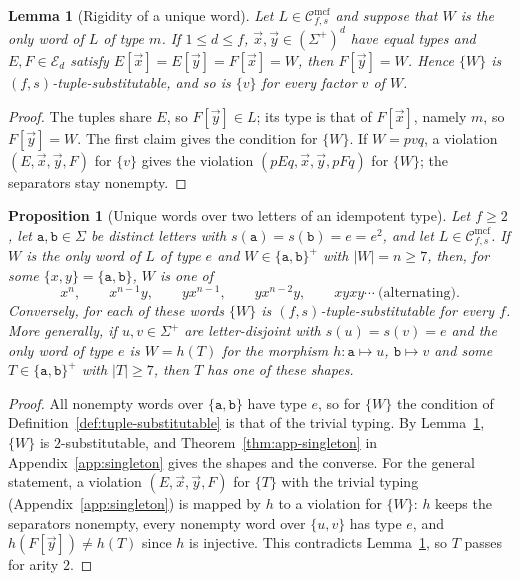 \documentclass[11pt]{article}
\numberwithin{equation}{section}
\theoremstyle{plain}
\newtheorem{lemma}[theorem]{Lemma}
\newtheorem{proposition}[theorem]{Proposition}
\theoremstyle{definition}
\theoremstyle{remark}
\newcommand{\Cmcf}[2]{\mathcal{C}^{\mathrm{mcf}}_{#1,#2}}
\newcommand{\tuple}[1]{\vec{#1}}
\theoremstyle{plain}
\begin{document}
\begin{lemma}[Rigidity of a unique word]
\label{lem:unique-word-rigid}
Let $L\in\Cmcf{f}{s}$ and suppose that $W$ is the only word of $L$ of type $m$.
If $1\le d\le f$, $\tuple x,\tuple y\in(\Sigma^+)^d$ have equal types and
$E,F\in\mathcal E_d$ satisfy $E[\tuple x]=E[\tuple y]=F[\tuple x]=W$, then
$F[\tuple y]=W$.  Hence $\{W\}$ is $(f,s)$-tuple-substitutable, and so is $\{v\}$
for every factor $v$ of $W$.
\end{lemma}

\begin{proof}
The tuples share $E$, so $F[\tuple y]\in L$; its type is that of $F[\tuple x]$,
namely $m$, so $F[\tuple y]=W$.  The first claim gives the condition for $\{W\}$.
If $W=pvq$, a violation $(E,\tuple x,\tuple y,F)$ for $\{v\}$ gives the violation
$(pEq,\tuple x,\tuple y,pFq)$ for $\{W\}$; the separators stay nonempty.
\end{proof}

\begin{proposition}[Unique words over two letters of an idempotent type]
\label{prop:unique-two-letter-shapes}
Let $f\ge2$, let $\mathtt a,\mathtt b\in\Sigma$ be distinct letters with
$s(\mathtt a)=s(\mathtt b)=e=e^2$, and let $L\in\Cmcf{f}{s}$.  If $W$ is the only
word of $L$ of type $e$ and $W\in\{\mathtt a,\mathtt b\}^+$ with $|W|=n\ge7$, then,
for some $\{x,y\}=\{\mathtt a,\mathtt b\}$, $W$ is one of
\[
 x^n,\qquad x^{n-1}y,\qquad yx^{n-1},\qquad yx^{n-2}y,\qquad
 xyxy\cdots\ \text{(alternating)}.
\]
Conversely, for each of these words $\{W\}$ is $(f,s)$-tuple-substitutable for
every $f$.  More generally, if $u,v\in\Sigma^+$ are letter-disjoint with
$s(u)=s(v)=e$ and the only word of type $e$ is $W=h(T)$ for the morphism
$h:\mathtt a\mapsto u$, $\mathtt b\mapsto v$ and some $T\in\{\mathtt a,\mathtt b\}^+$ with
$|T|\ge7$, then $T$ has one of these shapes.
\end{proposition}

\begin{proof}
All nonempty words over $\{\mathtt a,\mathtt b\}$ have type $e$, so for
$\{W\}$ the condition of Definition~\ref{def:tuple-substitutable} is that of the
trivial typing.  By Lemma~\ref{lem:unique-word-rigid}, $\{W\}$ is
$2$-substitutable, and Theorem~\ref{thm:app-singleton} in
Appendix~\ref{app:singleton} gives the shapes and the converse.  For the general
statement, a violation $(E,\tuple x,\tuple y,F)$ for $\{T\}$ with the trivial
typing (Appendix~\ref{app:singleton}) is mapped by $h$ to a violation for $\{W\}$:
$h$ keeps the separators nonempty, every nonempty word over $\{u,v\}$ has type
$e$, and $h(F[\tuple y])\ne h(T)$ since $h$ is injective.  This contradicts
Lemma~\ref{lem:unique-word-rigid}, so $T$ passes for arity $2$.
\end{proof}
\end{document}
